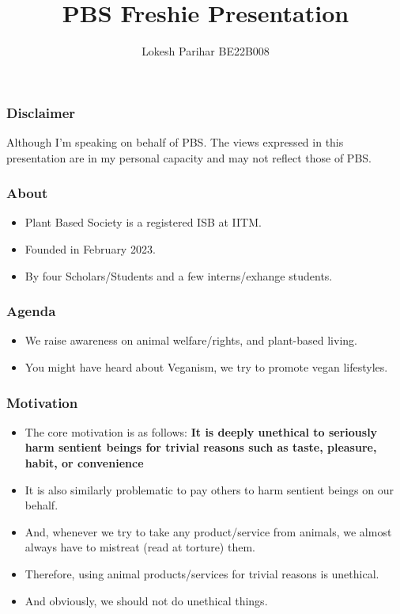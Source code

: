 \documentclass[aspectratio=43]{beamer}
\title{PBS Freshie Presentation}
\author{Lokesh Parihar BE22B008}
\begin{document}
\begin{frame}
    \maketitle
\end{frame}

\begin{frame}
    \frametitle{Disclaimer}
    Although I'm speaking on behalf of PBS. The views expressed in this presentation are in my personal capacity and may not reflect those of PBS.
\end{frame}

\begin{frame}
    \frametitle{About}
    \begin{itemize}
        \item Plant Based Society is a registered ISB at IITM.
        \item Founded in February 2023.
        \item By four Scholars/Students and a few interns/exhange students.
    \end{itemize}
\end{frame}

\begin{frame}
    \frametitle{Agenda}
    \begin{itemize}
        \item We raise awareness on animal welfare/rights, and plant-based living.
        \item You might have heard about Veganism, we try to promote vegan lifestyles.
    \end{itemize}
\end{frame}

\begin{frame}
    \frametitle{Motivation}
    \begin{itemize}
        \item The core motivation is as follows: \textbf{It is deeply unethical to seriously harm sentient beings for trivial reasons such as taste, pleasure, habit, or convenience}
        \item It is also similarly problematic to pay others to harm sentient beings on our behalf.
        \item And, whenever we try to take any product/service from animals, we almost always have to mistreat (read at torture) them. 
        \item Therefore, using animal products/services for trivial reasons is unethical.
        \item And obviously, we should not do unethical things.
    \end{itemize}
\end{frame}
\end{document}
